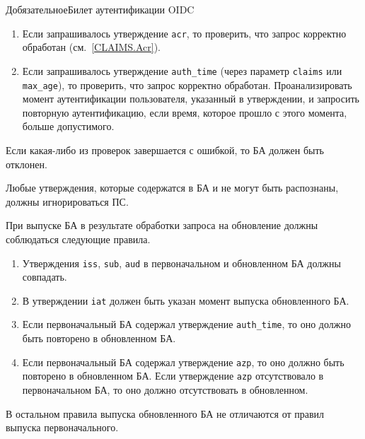 \begin{appendix}{Д}{обязательное}{Билет аутентификации OIDC}
\begin{enumerate}
\item Если запрашивалось утверждение \lstinline{acr}, то проверить,
что запрос корректно обработан (см.~\ref{CLAIMS.Acr}). 

\item Если запрашивалось утверждение \lstinline{auth_time} 
(через параметр \lstinline{claims} или \lstinline{max_age}), 
то проверить, что запрос корректно обработан.
%
Проанализировать момент аутентификации пользователя,
указанный в утверждении, и запросить повторную аутентификацию, 
если время, которое прошло с этого момента, больше допустимого.
\end{enumerate}

Если какая-либо из проверок завершается с ошибкой, то БА должен быть отклонен.

Любые утверждения, которые содержатся в БА
и не могут быть распознаны, должны игнорироваться ПС.
 
\label{IDTOKEN.Refresh}

При выпуске БА в результате обработки запроса на обновление должны соблюдаться 
следующие правила.

\begin{enumerate}
\item
Утверждения \lstinline{iss}, \lstinline{sub}, \lstinline{aud}
в первоначальном и обновленном БА должны совпадать.

\item
В утверждении \lstinline{iat} должен быть указан момент выпуска обновленного БА. 

\item
Если первоначальный БА содержал утверждение \lstinline{auth_time}, то оно
должно быть повторено в обновленном БА.

\item
Если первоначальный БА содержал утверждение \lstinline{azp}, то оно
должно быть повторено в обновленном БА.
%
Если утверждение \lstinline{azp} отсутствовало в первоначальном БА, то оно 
должно отсутствовать в обновленном.
\end{enumerate}

В остальном правила выпуска обновленного БА не отличаются от правил выпуска 
первоначального.

\end{appendix}

